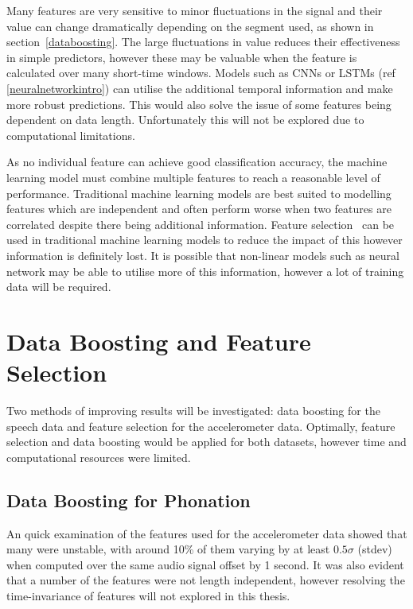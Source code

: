 \documentclass[12pt, twoside]{book}
\begin{document}
Many features are very sensitive to minor fluctuations in the signal and their value can change dramatically depending on the segment used, as shown in section~\ref{databoosting}. The large fluctuations in value reduces their effectiveness in simple predictors, however these may be valuable when the feature is calculated over many short-time windows. Models such as CNNs or LSTMs (ref \ref{neuralnetworkintro}) can utilise the additional temporal information and make more robust predictions. This would also solve the issue of some features being dependent on data length. Unfortunately this will not be explored due to computational limitations.

As no individual feature can achieve good classification accuracy, the machine learning model must combine multiple features to reach a reasonable level of performance. Traditional machine learning models are best suited to modelling features which are independent and often perform worse when two features are correlated despite there being additional information. Feature selection~\cite{skfeature} can be used in traditional machine learning models to reduce the impact of this however information is definitely lost. It is possible that non-linear models such as neural network may be able to utilise more of this information, however a lot of training data will be required.

\section{Data Boosting and Feature Selection}

Two methods of improving results will be investigated: data boosting for the speech data and feature selection for the accelerometer data. Optimally, feature selection and data boosting would be applied for both datasets, however time and computational resources were limited.

\subsection{Data Boosting for Phonation}
An quick examination of the features used for the accelerometer data showed that many were unstable, with around 10\% of them varying by at least $0.5\sigma$ (stdev) when computed over the same audio signal offset by 1 second. It was also evident that a number of the features were not length independent, however resolving the time-invariance of features will not explored in this thesis.
\end{document}
